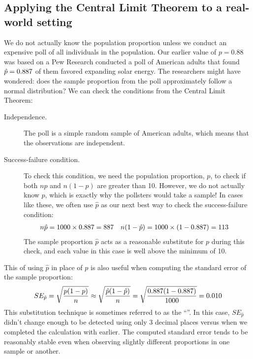 \subsection{Applying the Central Limit Theorem to
    a real-world setting}
\label{apply_clt_real_world_setting}

We do not actually know the population proportion
unless we conduct an expensive poll of all individuals
in the population.
Our earlier value of $p = 0.88$ was based on
a Pew Research conducted a poll of \pewsolarpollsize{}
American adults that found
$\hat{p} = 0.887{}$ of them favored
expanding solar energy.
The researchers might have wondered:
does the sample proportion from the poll approximately
follow a normal distribution?
We can check the conditions from the Central Limit Theorem:
\begin{description}
\item[Independence.] The poll is a simple random sample of
    American adults, which means that the observations are
    independent.
\item[Success-failure condition.] To check this condition,
    we need the population proportion, $p$, to check if both
    $np$ and $n(1-p)$ are greater than 10.
    However, we do not actually know $p$, which
    is exactly why the pollsters would take a sample!
    In cases like these, we often use $\hat{p}$
    as our next best way to check the success-failure condition:
    \begin{align*}
    n\hat{p}
        &= 1000{} \times 0.887{}
        = 887{}
    &n (1 - \hat{p})
        &= 1000{} \times (1 - 0.887{})
        = 113{}
    \end{align*}
    The sample proportion $\hat{p}$ acts as
    a reasonable substitute for $p$ during this check,
    and each value in this case is well above the minimum of 10.
\end{description}

This  of using $\hat{p}$ in
place of $p$ is also useful when computing the standard error
of the sample proportion:
\begin{align*}
SE_{\hat{p}}
    = \sqrt{\frac{p (1 - p)}{n}}
    \approx \sqrt{\frac{\hat{p} (1 - \hat{p})}{n}}
    = \sqrt{\frac{0.887{}
        (1 - 0.887{})}{1000{}}}
    = 0.010{}
\end{align*}
This substitution technique is sometimes
referred to as the ``''.
In this case, $SE_{\hat{p}}$ didn't change enough to
be detected using only 3 decimal places
versus when we completed the calculation with
\pewsolarparprop{} earlier.
The computed standard error tends to be reasonably stable
even when observing slightly different proportions in one
sample or another.


